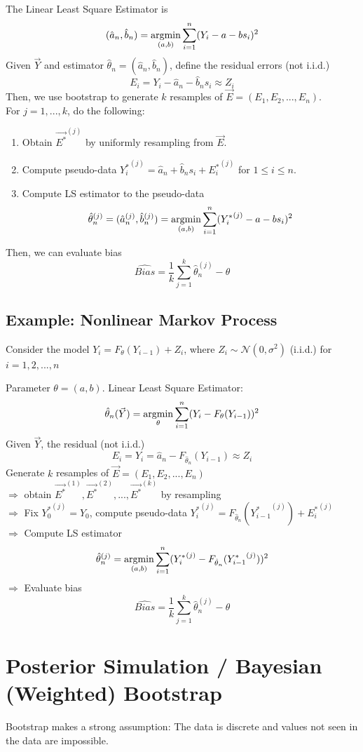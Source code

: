 \documentclass[11pt]{elegantbook}
\newcommand{\argmin}{\operatornamewithlimits{argmin}}
\begin{document}
The Linear Least Square Estimator is
$$(\hat{a}_n,\hat{b}_n)=\argmin_{(a,b)}\sum_{i=1}^n(Y_i-a-bs_i)^2$$
Given $\vec{Y}$ and estimator $\hat{\theta}_n=(\hat{a}_n,\hat{b}_n)$, define the residual errors (not i.i.d.)$$E_i=Y_i-\hat{a}_n-\hat{b}_ns_i\approx Z_i$$
Then, we use bootstrap to generate $k$ resamples of $\vec{E}=(E_1,E_2,...,E_n)$.\\
For $j=1,...,k$, do the following:
\begin{enumerate}
    \item Obtain $\vec{E^*}^{(j)}$ by uniformly resampling from $\vec{E}$.
    \item Compute pseudo-data ${Y_i^*}^{(j)}=\hat{a}_n+\hat{b}_ns_i+{E_i^*}^{(j)}$ for $1\leq i\leq n$.
    \item Compute LS estimator to the pseudo-data $$\hat{\theta}_n^{(j)}=(\hat{a}_n^{(j)},\hat{b}_n^{(j)})=\argmin_{(a,b)}\sum_{i=1}^n({Y_i^*}^{(j)}-a-bs_i)^2$$
\end{enumerate}
Then, we can evaluate bias $$\widehat{Bias}=\frac{1}{k}\sum_{j=1}^k \hat{\theta}_n^{(j)}-\theta$$

\subsection{Example: Nonlinear Markov Process}
Consider the model $Y_i=F_{\theta}(Y_{i-1})+Z_i$, where $Z_i\sim \mathcal{N}(0,\sigma^2)$ (i.i.d.) for $i=1,2,...,n$

Parameter $\theta=(a,b)$. Linear Least Square Estimator:
$$\hat{\theta}_n(\vec{Y})=\argmin_{\theta}\sum_{i=1}^n(Y_i-F_{\theta}(Y_{i-1}))^2$$
Given $\vec{Y}$, the residual (not i.i.d.)$$E_i=Y_i=\hat{a}_n-F_{\hat{\theta}_n}(Y_{i-1})\approx Z_i$$
Generate $k$ resamples of $\vec{E}=(E_1,E_2,...,E_n)$\\
$\Rightarrow$ obtain $\vec{E^*}^{(1)},\vec{E^*}^{(2)},...,\vec{E^*}^{(k)}$ by resampling\\
$\Rightarrow$ Fix ${Y_0^*}^{(j)}=Y_0$, compute pseudo-data ${Y_i^*}^{(j)}=F_{\hat{\theta}_n}({Y^*_{i-1}}^{(j)})+{E_i^*}^{(j)}$\\
$\Rightarrow$ Compute LS estimator $$\hat{\theta}_n^{(j)}=\argmin_{(a,b)}\sum_{i=1}^n({Y_i^*}^{(j)}-F_{\hat{\theta}_n}({Y^*_{i-1}}^{(j)}))^2$$
$\Rightarrow$ Evaluate bias $$\widehat{Bias}=\frac{1}{k}\sum_{j=1}^k \hat{\theta}_n^{(j)}-\theta$$


\section{Posterior Simulation / Bayesian (Weighted) Bootstrap}
\begin{assumption}
    Bootstrap makes a strong assumption: The data is discrete and values not seen in the data are impossible.
\end{assumption}
\end{document}

